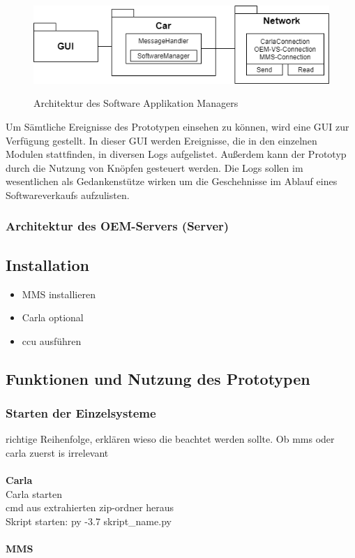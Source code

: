 \begin{figure}[!h]
	\centering
	\includegraphics[width=0.5\columnwidth]{pictures/konzept-SAM.png}
	\label{img:sam}
	\caption{Architektur des Software Applikation Managers}
\end{figure}

Um Sämtliche Ereignisse des Prototypen einsehen zu können, wird eine GUI zur Verfügung gestellt. In dieser GUI werden Ereignisse, die in den einzelnen Modulen stattfinden, in diversen Logs aufgelistet. Außerdem kann der Prototyp durch die Nutzung von Knöpfen gesteuert werden. Die Logs sollen im wesentlichen als Gedankenstütze wirken um die Geschehnisse im Ablauf eines Softwareverkaufs aufzulisten.
\subsubsection{Architektur des OEM-Servers (Server)}
\subsection{Installation}
\begin{itemize}
	\item MMS installieren
	\item Carla optional
	\item ccu ausführen
\end{itemize}
\subsection{Funktionen und Nutzung des Prototypen}
\subsubsection{Starten der Einzelsysteme}
richtige Reihenfolge, erklären wieso die beachtet werden sollte. Ob mms oder carla zuerst is irrelevant\\\\
\textbf{Carla}\\
Carla starten\\
cmd aus extrahierten zip-ordner heraus\\
Skript starten: py -3.7 skript\_name.py\\\\
\textbf{MMS}\\


